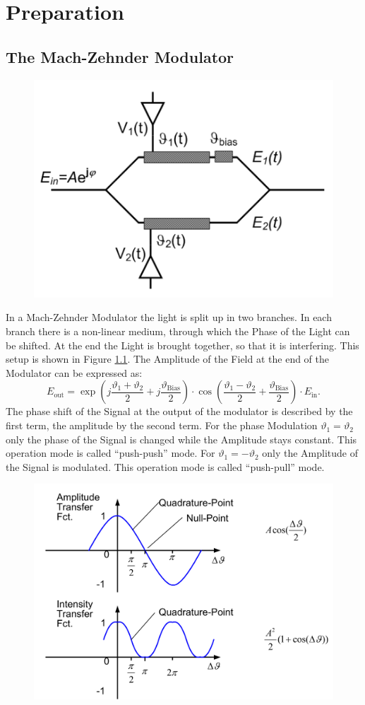 \chapter{Preparation}
\section{The Mach-Zehnder Modulator}
\begin{figure}
  \centering
  \includegraphics[width=.5\columnwidth]{Grafiken/Mach-Zehnder.jpg}

\caption{}
\label{fig:MZI}
\end{figure}
In a Mach-Zehnder Modulator the light is split up in two branches. In each branch there is a non-linear medium, through which the Phase of the Light can be shifted. At the end the Light is brought together, so that it is interfering. This setup is shown in Figure \ref{fig:MZI}. The Amplitude of the Field at the end of the Modulator can be expressed as:
\begin{equation}
 E_{\mathrm{out}}=\exp\left(j\frac{\vartheta_1+\vartheta_2}{2}+j\frac{\vartheta_{\mathrm{Bias}}}{2} \right)\cdot\cos\left(\frac{\vartheta_1-\vartheta_2}{2}+\frac{\vartheta_{\mathrm{Bias}}}{2}\right)\cdot E_{\mathrm{in}} .
\end{equation}
The phase shift of the Signal at the output of the modulator is described by the first term, the amplitude by the second term. For the phase Modulation $\vartheta_1 = \vartheta_2$ only the phase of the Signal is changed while the Amplitude stays constant. This operation mode is called "`push-push"' mode. For $\vartheta_1 = -\vartheta_2$ only the Amplitude of the Signal is modulated. This operation mode is called "`push-pull"' mode.  \cite{OCS}

\begin{figure}
  \centering
  \includegraphics[width=.5\columnwidth]{Grafiken/Mach-Zender-Transfer.jpg}

\caption{}
\label{fig:MZI_plot}
\end{figure}


